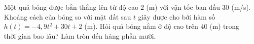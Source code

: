 \begin{bt}%
	Một quả bóng được bắn thẳng lên từ độ cao $2$ (m) với vận tốc ban đầu $30$ (m/s). Khoảng cách của bóng so với mặt đất sau $t$ giây được cho bởi hàm số $h(t)=-4{,}9t^2+30t+2$ (m). Hỏi quả bóng nằm ở độ cao trên $40$ (m) trong thời gian bao lâu? Làm tròn đến hàng phần mười.
\end{bt}
